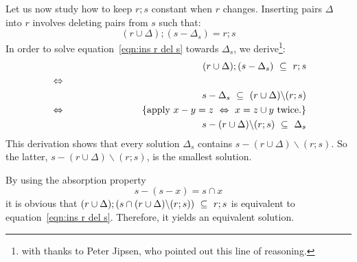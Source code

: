 \documentclass{svproc}
\begin{document}
	Let us now study how to keep $r;s$ constant when $r$ changes.
	Inserting pairs $\Delta$ into $r$ involves deleting pairs from $s$ such that:
\begin{equation}
(r\cup \Delta);(s-\Delta_s)=r;s\label{eqn:ins r del s}
\end{equation}
	In order to solve equation~\ref{eqn:ins r del s} towards $\Delta_s$,
	we derive\footnote{with thanks to Peter Jipsen, who pointed out this line of reasoning.}:
\begin{eqnarray}
&&(r\cup \Delta);(s-\Delta_s)\ \subs\ r;s\label{eqn:rs subs t by ins r del s}\\
&\Leftrightarrow&\nonumber\\
&&s-\Delta_s\ \subs\ (r\cup \Delta)\backslash(r;s)\nonumber\\
&\Leftrightarrow&\hspace{1in}\{\text{apply }x-y=z\ \Leftrightarrow\ x=z\cup y\text{ twice.}\}\nonumber\\
&&s-(r\cup \Delta)\backslash(r;s)\ \subs\ \Delta_s\nonumber
\end{eqnarray}
	This derivation shows that every solution $\Delta_s$ contains $s-(r\cup \Delta)\backslash(r;s)$.
	So the latter, $s-(r\cup \Delta)\backslash(r;s)$, is the smallest solution.

	By using the absorption property
\begin{equation}
s-(s-x)=s\cap x\label{absorb x}
\end{equation}
	it is obvious that $(r\cup \Delta);(s\cap(r\cup \Delta)\backslash(r;s))\ \subseteq\ r;s$ is equivalent to equation~\ref{eqn:ins r del s}. Therefore, it yields an equivalent solution. 
\end{document}
